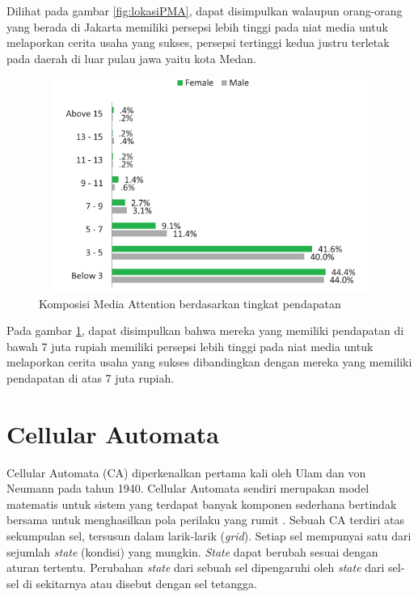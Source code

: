 \begin{enumerate}
Dilihat pada gambar \ref{fig:lokasiPMA}, dapat disimpulkan walaupun orang-orang yang berada di Jakarta memiliki persepsi lebih tinggi pada niat media untuk melaporkan cerita usaha yang sukses, persepsi tertinggi kedua justru terletak pada daerah di luar pulau jawa yaitu kota Medan.

\begin{figure} [H]
	\centering  
	\includegraphics[width=12cm, height=7cm]{pendapatanPMA2013} 
	\caption[Komposisi Media Attention berdasarkan tingkat pendapatan]{Komposisi Media Attention berdasarkan tingkat pendapatan} 
	\label{fig:pendapatanPMA} 
\end{figure} 

Pada gambar \ref{fig:pendapatanPMA}, dapat disimpulkan bahwa mereka yang memiliki pendapatan di bawah 7 juta rupiah memiliki persepsi lebih tinggi pada niat media untuk melaporkan cerita usaha yang sukses dibandingkan dengan mereka yang memiliki pendapatan di atas 7 juta rupiah.
\end{enumerate}
\section{Cellular Automata}
\label{sec:cellularautomata}

Cellular Automata (CA) diperkenalkan pertama kali oleh Ulam dan von Neumann pada tahun 1940. Cellular Automata sendiri merupakan model matematis untuk sistem yang terdapat banyak komponen sederhana bertindak bersama untuk menghasilkan pola perilaku yang rumit \cite{referensiCA2}. Sebuah CA terdiri atas sekumpulan sel, tersusun dalam larik-larik (\textit{grid}). Setiap sel mempunyai satu dari sejumlah \textit{state} (kondisi) yang mungkin. \textit{State} dapat berubah sesuai dengan aturan tertentu. Perubahan \textit{state} dari sebuah sel dipengaruhi oleh \textit{state} dari sel-sel di sekitarnya atau disebut dengan sel tetangga.

